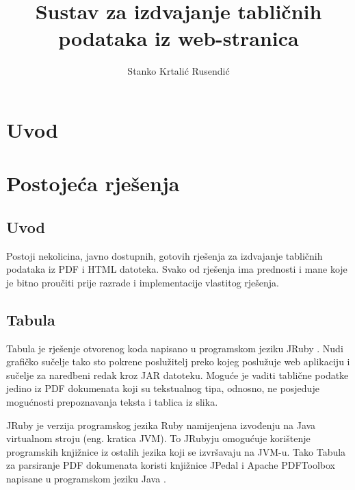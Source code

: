\documentclass[times, utf8, zavrsni]{fer}
\begin{document}

\title{Sustav za izdvajanje tabličnih podataka iz web-stranica}

\author{Stanko Krtalić Rusendić}

\maketitle


\tableofcontents

\chapter{Uvod}



\chapter{Postojeća rješenja}

\section{Uvod}

Postoji nekolicina, javno dostupnih, gotovih rješenja za izdvajanje tabličnih
podataka iz PDF \cite{pdf_documentation}
i HTML \cite{html_documentation}
datoteka. Svako od rješenja ima prednosti i mane koje je
bitno proučiti prije razrade i implementacije vlastitog rješenja.

\section{Tabula}

Tabula \cite{tabula_repository} je rješenje otvorenog koda napisano u
programskom jeziku JRuby \cite{jruby_documentation}.
Nudi grafičko sučelje tako sto pokrene poslužitelj preko kojeg poslužuje web
aplikaciju i sučelje za naredbeni redak kroz
JAR \cite{java_language_specification} datoteku. Moguće je vaditi
tablične podatke jedino iz PDF dokumenata koji su tekstualnog tipa, odnosno,
ne posjeduje mogućnosti prepoznavanja teksta i tablica iz slika.

JRuby je verzija programskog jezika Ruby namijenjena izvođenju na Java
virtualnom stroju \cite{java_virtual_machine_specification} (eng. kratica JVM).
To JRubyju omogućuje korištenje
programskih knjižnice iz ostalih jezika koji se izvršavaju na JVM-u. Tako
Tabula za parsiranje PDF dokumenata koristi knjižnice JPedal i Apache
PDFToolbox \cite{apache_pdftoolbox_specification} napisane u programskom
jeziku Java \cite{java_language_specification}.
\end{document}
